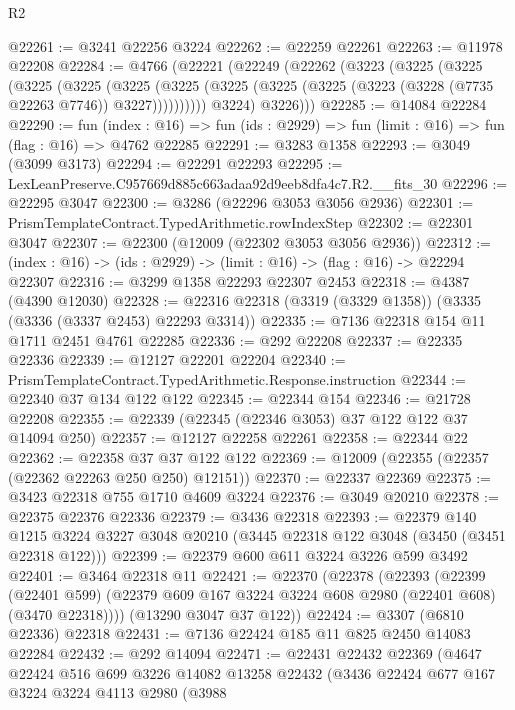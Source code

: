 \begin{lexlean}{R2}
\begin{coremodule}
@22261 := @3241 @22256 @3224
@22262 := @22259 @22261
@22263 := @11978 @22208
@22284 := @4766
    (@22221
      (@22249
        (@22262
          (@3223
            (@3225
              (@3225
                (@3225
                  (@3225
                    (@3225
                      (@3225
                        (@3225 (@3225 (@3225 (@3223 (@3228 (@7735 @22263 @7746)) @3227))))))))))
            @3224)
          @3226)))
@22285 := @14084 @22284
@22290 := fun (index : @16) =>
  fun (ids : @2929) => fun (limit : @16) => fun (flag : @16) => @4762 @22285
@22291 := @3283 @1358
@22293 := @3049 (@3099 @3173)
@22294 := @22291 @22293
@22295 := LexLeanPreserve.C957669d885c663adaa92d9eeb8dfa4c7.R2.__fits_30
@22296 := @22295 @3047
@22300 := @3286 (@22296 @3053 @3056 @2936)
@22301 := PrismTemplateContract.TypedArithmetic.rowIndexStep
@22302 := @22301 @3047
@22307 := @22300 (@12009 (@22302 @3053 @3056 @2936))
@22312 := (index : @16) -> (ids : @2929) -> (limit : @16) -> (flag : @16) -> @22294 @22307
@22316 := @3299 @1358 @22293 @22307 @2453
@22318 := @4387 (@4390 @12030)
@22328 := @22316 @22318 (@3319 (@3329 @1358)) (@3335 (@3336 (@3337 @2453) @22293 @3314))
@22335 := @7136 @22318 @154 @11 @1711 @2451 @4761 @22285
@22336 := @292 @22208
@22337 := @22335 @22336
@22339 := @12127 @22201 @22204
@22340 := PrismTemplateContract.TypedArithmetic.Response.instruction
@22344 := @22340 @37 @134 @122 @122
@22345 := @22344 @154
@22346 := @21728 @22208
@22355 := @22339 (@22345 (@22346 @3053) @37 @122 @122 @37 @14094 @250)
@22357 := @12127 @22258 @22261
@22358 := @22344 @22
@22362 := @22358 @37 @37 @122 @122
@22369 := @12009 (@22355 (@22357 (@22362 @22263 @250 @250) @12151))
@22370 := @22337 @22369
@22375 := @3423 @22318 @755 @1710 @4609 @3224
@22376 := @3049 @20210
@22378 := @22375 @22376 @22336
@22379 := @3436 @22318
@22393 := @22379
    @140
    @1215
    @3224
    @3227
    @3048
    @20210
    (@3445 @22318 @122 @3048 (@3450 (@3451 @22318 @122)))
@22399 := @22379 @600 @611 @3224 @3226 @599 @3492
@22401 := @3464 @22318 @11
@22421 := @22370
    (@22378
      (@22393
        (@22399
          (@22401 @599)
          (@22379 @609 @167 @3224 @3224 @608 @2980 (@22401 @608) (@3470 @22318))))
      (@13290 @3047 @37 @122))
@22424 := @3307 (@6810 @22336) @22318
@22431 := @7136 @22424 @185 @11 @825 @2450 @14083 @22284
@22432 := @292 @14094
@22471 := @22431
    @22432
    @22369
    (@4647
      @22424
      @516
      @699
      @3226
      @14082
      @13258
      @22432
      (@3436
        @22424
        @677
        @167
        @3224
        @3224
        @4113
        @2980
        (@3988

\end{coremodule}
\end{lexlean}
